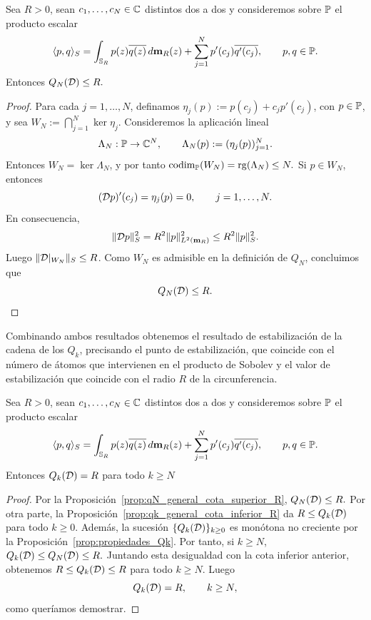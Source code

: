 \begin{prop}\label{prop:qN_general_cota_superior_R}
	Sea $R>0$, sean $c_1,\dots,c_N\in\mathbb{C}$ distintos dos a dos y consideremos sobre $\mathbb{P}$ el producto escalar
	\[
		\langle p,q\rangle_S
		=
		\int_{\mathbb{S}_R}p(z)\overline{q(z)}\,d\mathbf{m}_R(z)
		+
		\sum_{j=1}^N p'(c_j)\overline{q'(c_j)},
		\qquad p,q\in\mathbb{P}.
	\]
	Entonces
	\(
	Q_N(\mathcal{D})\le R.
	\)
\end{prop}

\begin{proof}
	Para cada $j=1,\dots,N$, definamos $\eta_j(p):=p(c_j)+c_jp'(c_j)$, con $p\in\mathbb{P}$, y sea $W_N:=\bigcap_{j=1}^N\ker\eta_j$.
	Consideremos la aplicación lineal
	\[
		\Lambda_N:\mathbb{P}\to\mathbb{C}^N,
		\qquad
		\Lambda_N(p):=(\eta_j(p))_{j=1}^N.
	\]
	Entonces $W_N=\ker\Lambda_N$, y por tanto
	\(
	\operatorname{codim}_{\mathbb{P}}(W_N)=\operatorname{rg}(\Lambda_N)\le N.
	\)
	Si $p\in W_N$, entonces
	\[
		(\mathcal{D} p)'(c_j)=\eta_j(p)=0,
		\qquad j=1,\dots,N.
	\]
	En consecuencia,
	\[
		\|\mathcal{D} p\|_S^2=R^2\|p\|_{L^2(\mathbf{m}_R)}^2\le R^2\|p\|_S^2.
	\]
	Luego $\|\mathcal{D}|_{W_N}\|_S\le R$.
	Como $W_N$ es admisible en la definición de $Q_N$, concluimos que
	\[
		Q_N(\mathcal{D})\le R.
	\]
\end{proof}

Combinando ambos resultados obtenemos el resultado de estabilización de la cadena de los $Q_k$, precisando el punto de estabilización, que coincide con el número de átomos que intervienen en el producto de Sobolev y el valor de estabilización que coincide con el radio $R$ de la circunferencia.

\begin{thm}\label{thm:qk_vale_R_desde_N}
	Sea $R>0$, sean $c_1,\dots,c_N\in\mathbb{C}$ distintos dos a dos y consideremos sobre $\mathbb{P}$ el producto escalar
	\[
		\langle p,q\rangle_S
		=
		\int_{\mathbb{S}_R}p(z)\overline{q(z)}\,d\mathbf{m}_R(z)
		+
		\sum_{j=1}^N p'(c_j)\overline{q'(c_j)},
		\qquad p,q\in\mathbb{P}.
	\]
	Entonces
	\(
	Q_k(\mathcal{D})=R
	\) para todo $ k\ge N$
\end{thm}

\begin{proof}
	Por la Proposición~\ref{prop:qN_general_cota_superior_R},
	\(
	Q_N(\mathcal{D})\le R.
	\)
	Por otra parte, la Proposición~\ref{prop:qk_general_cota_inferior_R} da
	\(
	R\le Q_k(\mathcal{D}) \)
	para todo \(k\ge0.
	\)
	Además, la sucesión $\{Q_k(\mathcal{D})\}_{k\ge0}$ es monótona no creciente por la Proposición~\ref{prop:propiedades_Qk}. Por tanto, si $k\ge N$,
	\(
	Q_k(\mathcal{D})\le Q_N(\mathcal{D})\le R.
	\)
	Juntando esta desigualdad con la cota inferior anterior, obtenemos
	\(
	R\le Q_k(\mathcal{D})\le R\)
	para todo \(k\ge N.
	\)
	Luego
	\[
		Q_k(\mathcal{D})=R,
		\qquad k\ge N,
	\]
	como queríamos demostrar.
\end{proof}

